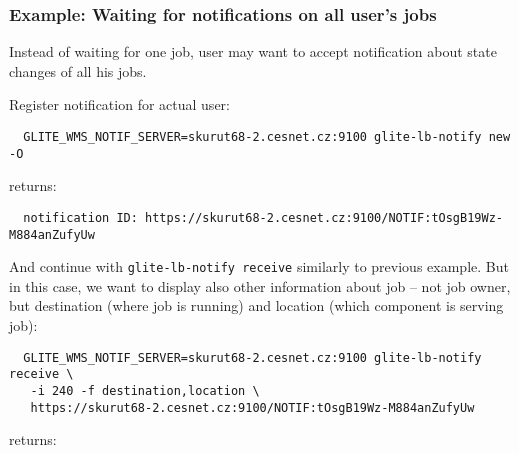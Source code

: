 \subsubsection{Example: Waiting for notifications on all user's jobs}

Instead of waiting for one job, user may want to accept notification about 
state changes of all his jobs.

Register notification for actual user:
\begin{verbatim}
  GLITE_WMS_NOTIF_SERVER=skurut68-2.cesnet.cz:9100 glite-lb-notify new -O
\end{verbatim}

returns:

\begin{verbatim}
  notification ID: https://skurut68-2.cesnet.cz:9100/NOTIF:tOsgB19Wz-M884anZufyUw 
\end{verbatim}

And continue with \verb'glite-lb-notify receive' similarly to previous example.
But in this case, we want to display also other information about job --
not job owner, but destination (where job is running) and location (which component is 
serving job):

\begin{verbatim}
  GLITE_WMS_NOTIF_SERVER=skurut68-2.cesnet.cz:9100 glite-lb-notify receive \
   -i 240 -f destination,location \
   https://skurut68-2.cesnet.cz:9100/NOTIF:tOsgB19Wz-M884anZufyUw
\end{verbatim}

returns:

